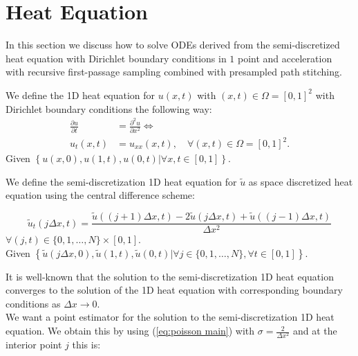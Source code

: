 \documentclass[a4paper,12pt]{article}
\begin{document}
\section{Heat Equation}

In this section we discuss how to solve ODEs derived from the semi-discretized heat equation
with Dirichlet boundary conditions in $1$ point and acceleration with recursive first-passage sampling
combined with presampled path stitching.

\begin{definition} \label{def:heat equation square}
  We define the 1D heat equation for $u(x,t)$ with $ (x,t) \in \Omega = [0,1]^2$
  with Dirichlet boundary conditions the following way:
  \begin{align}
    \frac{\partial u}{\partial t} & = \frac{\partial^{2} u}{\partial x^{2}}  \Leftrightarrow   \\
    u_t(x,t)                      & = u_{xx}(x,t), \quad \forall (x,t) \in \Omega = [0,1]^2  .
  \end{align}
  Given $\left\{u(x,0),u(1,t),u(0,t) | \forall x,t \in [0,1]  \right\} $.
\end{definition}

\begin{definition} \label{def:discrete heat equation square}
  We define the semi-discretization 1D heat equation for $\tilde{u}$ as space discretized heat equation
  using the central difference scheme:

  \begin{equation}
    \tilde{u}_t(j \Delta x,t)  = \frac{\tilde{u}((j+1) \Delta x, t)-2\tilde{u}(j \Delta x, t)+\tilde{u}((j-1) \Delta x, t)}{\Delta x^{2}}
  \end{equation}
  $\forall (j,t) \in \{0, 1, \ldots, N\} \times [0,1]$. \\
  Given $\left\{\tilde{u}(j \Delta x,0),\tilde{u}(1,t),\tilde{u}(0,t) | \forall j \in \{0, 1, \ldots, N\}, \forall t \in  [0,1]  \right\} $.
\end{definition}


It is well-known that the solution to the semi-discretization 1D heat equation converges to the solution of the 1D heat equation with
corresponding boundary conditions as $\Delta x \rightarrow 0$. \\
We want a point estimator for the solution to the semi-discretization 1D heat equation. We obtain this by
using (\ref{eq:poisson main}) with $\sigma = \frac{2}{\Delta x^{2}}$ and at the interior point $j$ this is:
\end{document}

